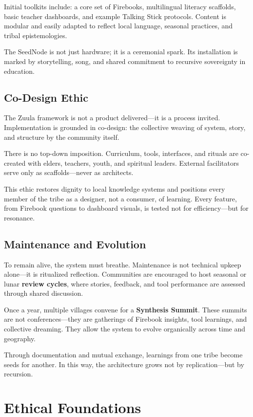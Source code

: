 \documentclass[12pt]{article}
\begin{document}
Initial toolkits include: a core set of Firebooks, multilingual literacy scaffolds, basic teacher dashboards, and example Talking Stick protocols. Content is modular and easily adapted to reflect local language, seasonal practices, and tribal epistemologies.

The SeedNode is not just hardware; it is a ceremonial spark. Its installation is marked by storytelling, song, and shared commitment to recursive sovereignty in education.

\subsection*{Co-Design Ethic}

The Zuula framework is not a product delivered—it is a process invited. Implementation is grounded in co-design: the collective weaving of system, story, and structure by the community itself.

There is no top-down imposition. Curriculum, tools, interfaces, and rituals are co-created with elders, teachers, youth, and spiritual leaders. External facilitators serve only as scaffolds—never as architects.

This ethic restores dignity to local knowledge systems and positions every member of the tribe as a designer, not a consumer, of learning. Every feature, from Firebook questions to dashboard visuals, is tested not for efficiency—but for resonance.

\subsection*{Maintenance and Evolution}

To remain alive, the system must breathe. Maintenance is not technical upkeep alone—it is ritualized reflection. Communities are encouraged to host seasonal or lunar \textbf{review cycles}, where stories, feedback, and tool performance are assessed through shared discussion.

Once a year, multiple villages convene for a \textbf{Synthesis Summit}. These summits are not conferences—they are gatherings of Firebook insights, tool learnings, and collective dreaming. They allow the system to evolve organically across time and geography.

Through documentation and mutual exchange, learnings from one tribe become seeds for another. In this way, the architecture grows not by replication—but by recursion.

\section*{Ethical Foundations}
\end{document}
